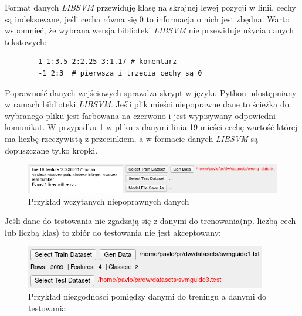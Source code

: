 \documentclass[paper=a4, fontsize=11pt]{scrartcl} %
\numberwithin{equation}{section} %
\numberwithin{figure}{section} %
\begin{document}
    \par Format danych \textit{LIBSVM} przewiduję klasę na skrajnej lewej pozycji w linii, cechy są
    indeksowane, jeśli cecha równa się 0 to informacja o nich jest zbędna. Warto wspomnieć, że
    wybrana wersja biblioteki \textit{LIBSVM} nie przewiduje użycia danych tekstowych:

    \begin{verbatim}
        1 1:3.5 2:2.25 3:1.17 # komentarz
        -1 2:3  # pierwsza i trzecia cechy są 0
    \end{verbatim}

    \par Poprawność danych wejściowych sprawdza skrypt w języku Python udostępniany w ramach
    biblioteki \textit{LIBSVM}. Jeśli plik mieści niepoprawne dane to ścieżka do wybranego
    pliku jest farbowana na czerwono i jest wypisywany odpowiedni komunikat. W przypadku
    \ref{fig:files_example1} w pliku z danymi linia 19 mieści cechę wartość której ma liczbę
    rzeczywistą z przecinkiem, a w formacie danych \textit{LIBSVM} są dopuszczane tylko kropki.

    \begin{figure}[h]
        \begin{center}
            \includegraphics[scale=0.8]{./img/svm_app_mainw_filehandler_ex_wrong.png}
            \caption{Przykład wczytanych niepoprawnych danych}
            \label{fig:files_example1}
        \end{center}
    \end{figure}

    \par Jeśli dane do testowania nie zgadzają się z danymi do trenowania(np. liczbą cech lub
    liczbą klas) to zbiór do testowania nie jest akceptowany: 

    \begin{figure}[h]
        \begin{center}
            \includegraphics[scale=1.0]{./img/svm_app_mainw_filehandler_ex_wrong2.png}
            \caption{Przykład niezgodności pomiędzy danymi do treningu a danymi do testowania}
            \label{fig:files_example2}
        \end{center}
    \end{figure}
\end{document}

